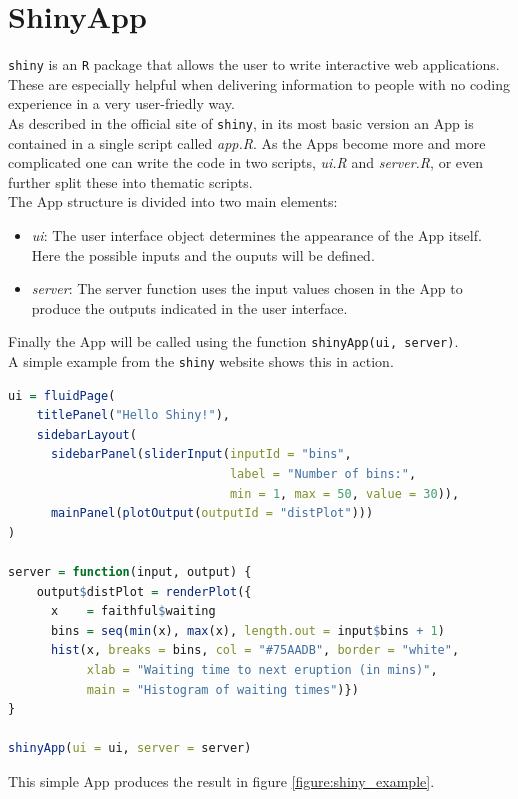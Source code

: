 \section{ShinyApp}\label{Sec:shiny}

\texttt{shiny} is an \texttt{R} package that allows the user to write interactive web applications. These are especially helpful when delivering information to people with no coding experience in a very user-friedly way.
\\
As described in the official site of \texttt{shiny}, in its most basic version an App is contained in a single script called \textit{app.R}. As the Apps become more and more complicated one can write the code in two scripts, \textit{ui.R} and \textit{server.R}, or even further split these into thematic scripts.
\\
The App structure is divided into two main elements:
\begin{itemize}
    \item \textit{ui}: The user interface object determines the appearance of the App itself. Here the possible inputs and the ouputs will be defined.
    \item \textit{server}: The server function uses the input values chosen in the App to produce the outputs indicated in the user interface. 
\end{itemize}

Finally the App will be called using the function \texttt{shinyApp(ui, server)}.
\\
A simple example from the \texttt{shiny} website shows this in action.

\begin{lstlisting}[language = R]
ui = fluidPage(
    titlePanel("Hello Shiny!"),
    sidebarLayout(
      sidebarPanel(sliderInput(inputId = "bins",
                               label = "Number of bins:",
                               min = 1, max = 50, value = 30)),
      mainPanel(plotOutput(outputId = "distPlot")))
)

server = function(input, output) {
    output$distPlot = renderPlot({
      x    = faithful$waiting
      bins = seq(min(x), max(x), length.out = input$bins + 1)
      hist(x, breaks = bins, col = "#75AADB", border = "white",
           xlab = "Waiting time to next eruption (in mins)",
           main = "Histogram of waiting times")})
}

shinyApp(ui = ui, server = server)
\end{lstlisting}

This simple App produces the result in figure \ref{figure:shiny_example}.

